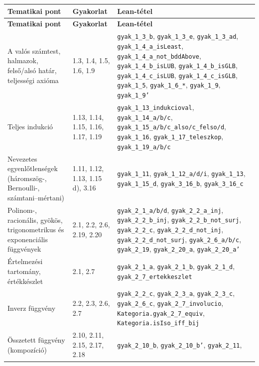 \documentclass[11pt,a4paper]{article}
\newcommand{\lean}[1]{\texttt{\small #1}}
\theoremstyle{definition}
\begin{document}
\begingroup
\small
\begin{longtable}{@{}p{4.4cm}p{3.0cm}p{7.4cm}@{}}
\toprule
\textbf{Tematikai pont} & \textbf{Gyakorlat} & \textbf{Lean-tétel} \\
\midrule
\endfirsthead
\toprule
\textbf{Tematikai pont} & \textbf{Gyakorlat} & \textbf{Lean-tétel} \\
\midrule
\endhead
\bottomrule
\endfoot
A valós számtest, halmazok, felső/alsó határ, teljességi axióma
  & 1.3, 1.4, 1.5, 1.6, 1.9
  & \lean{gyak\_1\_3\_b}, \lean{gyak\_1\_3\_e}, \lean{gyak\_1\_3\_ad},
    \lean{gyak\_1\_4\_a\_isLeast}, \lean{gyak\_1\_4\_a\_not\_bddAbove},
    \lean{gyak\_1\_4\_b\_isLUB}, \lean{gyak\_1\_4\_b\_isGLB},
    \lean{gyak\_1\_4\_c\_isLUB}, \lean{gyak\_1\_4\_c\_isGLB}, \lean{gyak\_1\_5},
    \lean{gyak\_1\_6\_*}, \lean{gyak\_1\_9}, \lean{gyak\_1\_9'} \\
\addlinespace
Teljes indukció
  & 1.13, 1.14, 1.15, 1.16, 1.17, 1.19
  & \lean{gyak\_1\_13\_indukcioval}, \lean{gyak\_1\_14\_a/b/c},
    \lean{gyak\_1\_15\_a/b/c\_also/c\_felso/d}, \lean{gyak\_1\_16},
    \lean{gyak\_1\_17\_teleszkop}, \lean{gyak\_1\_19\_a/b/c} \\
\addlinespace
Nevezetes egyenlőtlenségek (háromszög-, Bernoulli-, számtani--mértani)
  & 1.11, 1.12, 1.13, 1.15 d), 3.16
  & \lean{gyak\_1\_11}, \lean{gyak\_1\_12\_a/d/i}, \lean{gyak\_1\_13},
    \lean{gyak\_1\_15\_d}, \lean{gyak\_3\_16\_b}, \lean{gyak\_3\_16\_c} \\
\addlinespace
Polinom-, racionális, gyökös, trigonometrikus és exponenciális függvények
  & 2.1, 2.2, 2.6, 2.19, 2.20
  & \lean{gyak\_2\_1\_a/b/d}, \lean{gyak\_2\_2\_a\_inj},
    \lean{gyak\_2\_2\_b\_inj}, \lean{gyak\_2\_2\_b\_not\_surj},
    \lean{gyak\_2\_2\_c}, \lean{gyak\_2\_2\_d\_not\_inj},
    \lean{gyak\_2\_2\_d\_not\_surj}, \lean{gyak\_2\_6\_a/b/c},
    \lean{gyak\_2\_19}, \lean{gyak\_2\_20\_a}, \lean{gyak\_2\_20\_a'} \\
\addlinespace
Értelmezési tartomány, értékkészlet
  & 2.1, 2.7
  & \lean{gyak\_2\_1\_a}, \lean{gyak\_2\_1\_b}, \lean{gyak\_2\_1\_d},
    \lean{gyak\_2\_7\_ertekkeszlet} \\
\addlinespace
Inverz függvény
  & 2.2, 2.3, 2.6, 2.7
  & \lean{gyak\_2\_2\_c}, \lean{gyak\_2\_3\_a}, \lean{gyak\_2\_3\_c},
    \lean{gyak\_2\_6\_c}, \lean{gyak\_2\_7\_involucio},
    \lean{Kategoria.gyak\_2\_7\_equiv}, \lean{Kategoria.isIso\_iff\_bij} \\
\addlinespace
Összetett függvény (kompozíció)
  & 2.10, 2.11, 2.15, 2.17, 2.18
  & \lean{gyak\_2\_10\_b}, \lean{gyak\_2\_10\_b'}, \lean{gyak\_2\_11},

\end{longtable}
\end{document}

